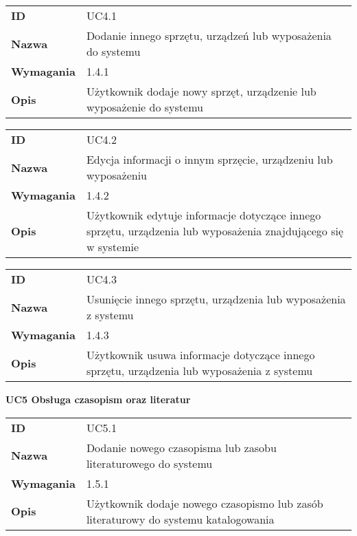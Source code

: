 \begin{tabular}{p{}p{}}
\hfill {\bf ID} & UC4.1  \\
\hfill {\bf Nazwa} & Dodanie innego sprzętu, urządzeń lub wyposażenia do systemu \\
\hfill {\bf Wymagania} & 1.4.1 \\
\hfill {\bf Opis} &  Użytkownik dodaje nowy sprzęt, urządzenie lub wyposażenie do systemu \\
\end{tabular}

\vspace{.05\textheight}

\begin{tabular}{p{}p{}}
\hfill {\bf ID} & UC4.2 \\
\hfill {\bf Nazwa} & Edycja informacji o innym sprzęcie, urządzeniu lub wyposażeniu \\
\hfill {\bf Wymagania} & 1.4.2  \\
\hfill {\bf Opis} & Użytkownik edytuje informacje dotyczące innego sprzętu, urządzenia lub wyposażenia znajdującego się w systemie \\
\end{tabular}

\vspace{.05\textheight}

\begin{tabular}{p{}p{}}
\hfill {\bf ID} & UC4.3  \\
\hfill {\bf Nazwa} & Usunięcie innego sprzętu, urządzenia lub wyposażenia z systemu \\
\hfill {\bf Wymagania} & 1.4.3 \\
\hfill {\bf Opis} & Użytkownik usuwa informacje dotyczące innego sprzętu, urządzenia lub wyposażenia z systemu \\
\end{tabular}

\vspace{.03\textheight}
\begin{center}
  {\Large\bf UC5 Obsługa czasopism oraz literatur } \\
\end{center}
\vspace{.02\textheight}

\begin{tabular}{p{}p{}}
\hfill {\bf ID} & UC5.1 \\
\hfill {\bf Nazwa} & Dodanie nowego czasopisma lub zasobu literaturowego do systemu \\
\hfill {\bf Wymagania} & 1.5.1 \\
\hfill {\bf Opis} & Użytkownik dodaje nowego czasopismo lub zasób literaturowy do systemu katalogowania \\
\end{tabular}

